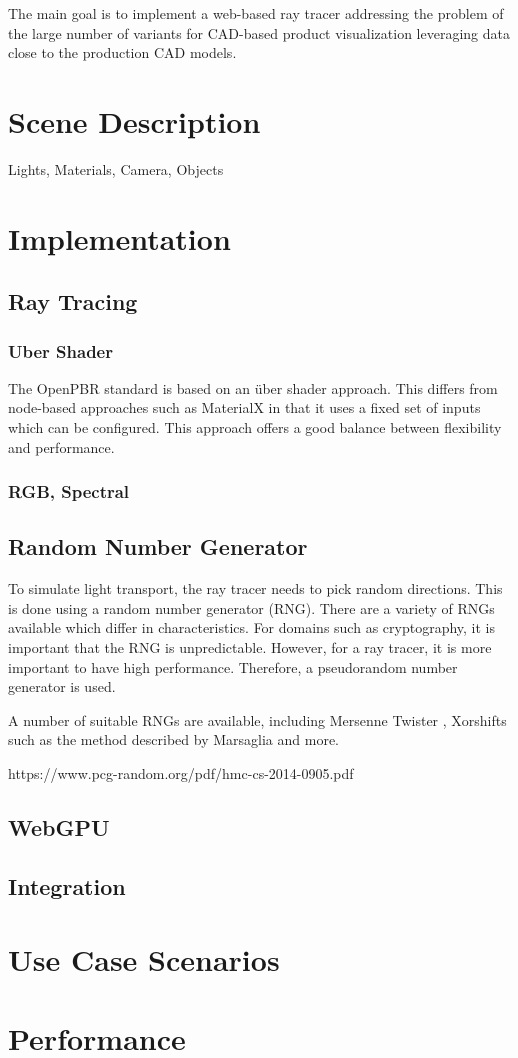 
The main goal is to implement a web-based ray tracer addressing the problem of the large number of variants for CAD-based product visualization leveraging data close to the production CAD models.

\section{Scene Description}
Lights, Materials, Camera, Objects
\section{Implementation}
\subsection{Ray Tracing}
\subsubsection{Uber Shader}

The OpenPBR standard is based on an über shader approach. This differs from node-based approaches such as MaterialX in that it uses a fixed set of inputs which can be configured. This approach offers a good balance between flexibility and performance.

\subsubsection{RGB, Spectral}
\subsection{Random Number Generator}

To simulate light transport, the ray tracer needs to pick random directions. This is done using a random number generator (RNG). There are a variety of RNGs available which differ in characteristics. For domains such as cryptography, it is important that the RNG is unpredictable. However, for a ray tracer, it is more important to have high performance. Therefore, a pseudorandom number generator is used.

A number of suitable RNGs are available, including Mersenne Twister \cite{rngMersenneTwister}, Xorshifts such as the method described by Marsaglia \cite{marsaglia2003xorshift} and more.

https://www.pcg-random.org/pdf/hmc-cs-2014-0905.pdf

\subsection{WebGPU}
\subsection{Integration}
\section{Use Case Scenarios}
\section{Performance}